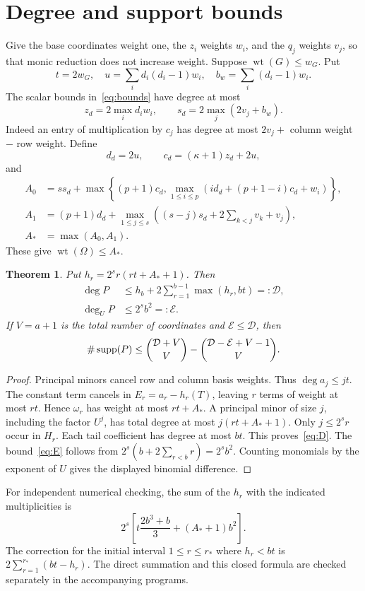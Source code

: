 \documentclass[11pt,a4paper]{article}
\newtheorem{theorem}{Theorem}[section]
\begin{document}
\section{Degree and support bounds}
Give the base coordinates weight one, the $z_i$ weights $w_i$, and the
$q_j$ weights $v_j$, so that monic reduction does not increase weight.
Suppose $\operatorname{wt}(G)\le w_G$. Put
\[
 t=2w_G,\quad u=\sum_i d_i(d_i-1)w_i,\quad
 b_w=\sum_i(d_i-1)w_i.
\]
The scalar bounds in~\eqref{eq:bounds} have degree at most
\[
 z_d=2\max_i d_iw_i,\qquad s_d=2\max_j(2v_j+b_w).
\]
Indeed an entry of multiplication by $c_j$ has degree at most
$2v_j+$ column weight $-$ row weight. Define
\[
 d_d=2u,\qquad c_d=(\kappa+1)z_d+2u,
\]
and
\begin{align*}
 A_0&=ss_d+\max\left\{(p+1)c_d,
        \max_{1\le i\le p}(id_d+(p+1-i)c_d+w_i)\right\},\\
 A_1&=(p+1)d_d+\max_{1\le j\le s}
        \left((s-j)s_d+2\sum_{k<j}v_k+v_j\right),\\
 A_*&=\max(A_0,A_1).
\end{align*}
These give $\operatorname{wt}(\Omega)\le A_*$.

\begin{theorem}\label{thm:degree}
Put $h_r=2^sr(rt+A_*+1)$. Then
\begin{align}
 \deg P&\le h_b+2\sum_{r=1}^{b-1}\max(h_r,bt)=:\mathcal D,\label{eq:D}\\
 \deg_U P&\le2^sb^2=:\mathcal E.\label{eq:E}
\end{align}
If $V=a+1$ is the total number of coordinates and $\mathcal E\le\mathcal D$,
then
\[
 \#\operatorname{supp}(P)\le
 \binom{\mathcal D+V}{V}-\binom{\mathcal D-\mathcal E+V-1}{V}.
\]
\end{theorem}
\begin{proof}
Principal minors cancel row and column basis weights. Thus
$\deg a_j\le jt$. The constant term cancels in $E_r=a_r-h_r(T)$,
leaving $r$ terms of weight at most $rt$. Hence $\omega_r$ has weight
at most $rt+A_*$. A principal minor of size $j$, including the factor
$U^j$, has total degree at most $j(rt+A_*+1)$. Only $j\le2^sr$
occur in $H_r$. Each tail coefficient has degree at most $bt$.
This proves~\eqref{eq:D}. The bound~\eqref{eq:E} follows from
$2^s(b+2\sum_{r<b}r)=2^sb^2$. Counting monomials by the exponent of
$U$ gives the displayed binomial difference.
\end{proof}
For independent numerical checking, the sum of the $h_r$ with the indicated
multiplicities is
\[
 2^s\left[t\frac{2b^3+b}{3}+(A_*+1)b^2\right].
\]
The correction for the initial interval $1\le r\le r_*$ where $h_r<bt$
is $2\sum_{r=1}^{r_*}(bt-h_r)$. The direct summation and this closed
formula are checked separately in the accompanying programs.
\end{document}
